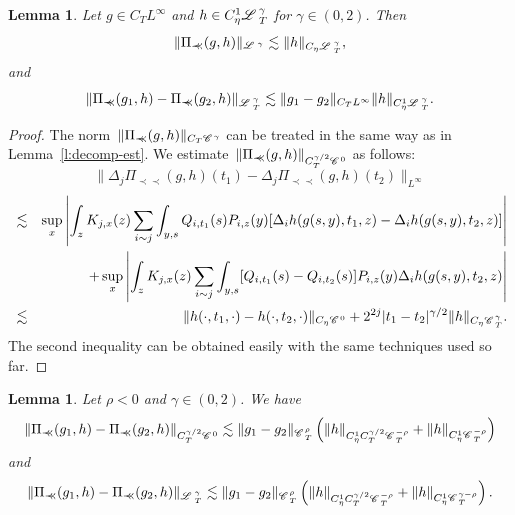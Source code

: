 \documentclass[11pt,reqno]{amsart}
\newcommand{\cdummy}{\cdot}
\newcommand{\precprec}{\prec\!\!\!\prec}
\newtheorem{lemma}[theorem]{Lemma}
\newcommand{\CC}{\mathscr{C} \hspace{.1em}}
\newcommand{\LL}{\mathscr{L} \hspace{.2em}}
\begin{document}
\begin{lemma}
  \label{l:nonlinear-est}Let $g \in C_T L^{\infty}$ and $h \in C^1_{\eta}
  \LL_T^{\gamma}$ for $\gamma \in (0, 2)$. Then
  \[ \| \Pi_{\precprec} (g, h) \|_{\LL^{\gamma}} \lesssim \| h \|_{C_{\eta}
     \LL_T^{\gamma}}, \]
  and
  \[ \| \Pi_{\precprec} (g_1, h) - \Pi_{\precprec} (g_2, h)
     \|_{\LL_T^{\gamma}} \lesssim \| g_1 - g_2 \|_{C_T L^{\infty}} \| h
     \|_{C^1_{\eta} \LL_T^{\gamma}} . \]
\end{lemma}

\begin{proof}
  The norm~$\| \Pi_{\precprec} (g, h) \|_{C_T \CC^{\gamma}}$ can be treated in
  the same way as in Lemma~\ref{l:decomp-est}. We estimate~$\| \Pi_{\precprec}
  (g, h) \|_{C_T^{\gamma / 2} \CC^0}$ as follows:
  \[ \| \Delta_j \Pi_{\precprec} (g, h) (t_1) - \Delta_j \Pi_{\precprec} (g,
     h) (t_2) \|_{L^{\infty}} \]
  \begin{eqnarray*}
    & \lesssim & \sup_x \left| \int_z K_{j, x} (z) \sum_{i \sim j} \int_{y,
    s} Q_{i, t_1} (s) P_{i, z} (y) [\Delta_i h (g (s, y), t_1, z) - \Delta_i h
    (g (s, y), t_2, z)] \right|\\
    &  & + \sup_x \left| \int_z K_{j, x} (z) \sum_{i \sim j} \int_{y, s}
    [Q_{i, t_1} (s) - Q_{i, t_2} (s)] P_{i, z} (y) \Delta_i h (g (s, y), t_2,
    z) \right|\\
    & \lesssim & \| h (\cdummy, t_1, \cdummy) - h (\cdummy, t_2, \cdummy)
    \|_{C_{\eta} \CC^0} + 2^{2 j} | t_1 - t_2 |^{\gamma / 2} \| h \|_{C_{\eta}
    \CC_T^{\gamma}} .
  \end{eqnarray*}
  The second inequality can be obtained easily with the same techniques used
  so far.
\end{proof}

\begin{lemma}
  \label{l:other-nonlinear-est}Let $\rho < 0$ and $\gamma \in (0, 2)$. We have
  \[ \| \Pi_{\precprec} (g_1, h) - \Pi_{\precprec} (g_2, h) \|_{C^{\gamma /
     2}_T \CC^0} \lesssim \| g_1 - g_2 \|_{\CC^{\rho}_T} \left( \| h
     \|_{C_{\eta}^1 C_T^{\gamma / 2} \CC_T^{- \rho}} + \| h \|_{C^1_{\eta}
     \CC^{- \rho}_T} \right) \]
  and
  \[ \| \Pi_{\precprec} (g_1, h) - \Pi_{\precprec} (g_2, h)
     \|_{\LL^{\gamma}_T} \lesssim \| g_1 - g_2 \|_{\CC^{\rho}_T} \left( \| h
     \|_{C_{\eta}^1 C_T^{\gamma / 2} \CC_T^{- \rho}} + \| h \|_{C^1_{\eta}
     \CC^{\gamma - \rho}_T} \right) . \]
\end{lemma}
\end{document}
